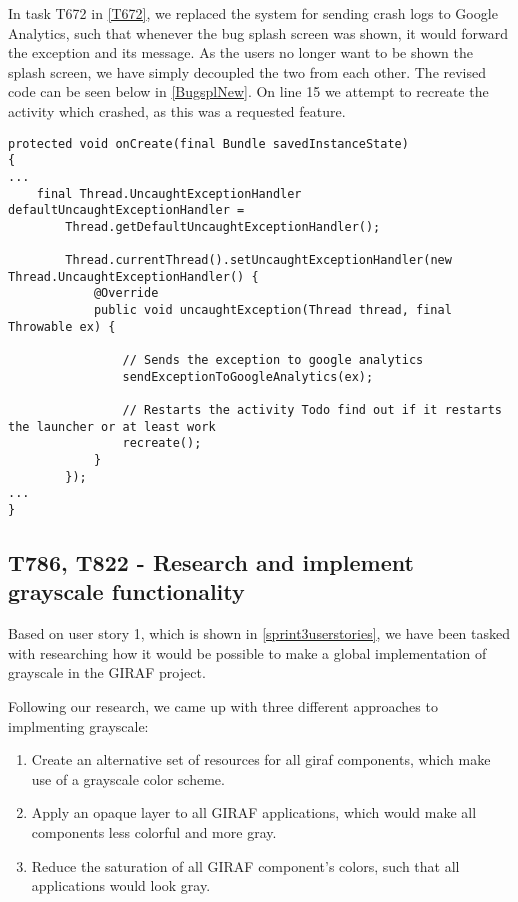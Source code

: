 In task T672 in \autoref{T672}, we replaced the system for sending crash logs to
Google Analytics, such that whenever the bug splash screen was shown, it would
forward the exception and its message. As the users no longer want to be shown
the splash screen, we have simply decoupled the two from each other. The revised
code can be seen below in \autoref{BugsplNew}. On line 15 we attempt to recreate
the activity which crashed, as this was a requested feature.\nl

\begin{minipage}[H]{\linewidth}
\begin{lstlisting}[caption = We use Google Analytics and try to recreate the activity, label = BugsplNew] 
protected void onCreate(final Bundle savedInstanceState) 
{ 
...
	final Thread.UncaughtExceptionHandler defaultUncaughtExceptionHandler =
    	Thread.getDefaultUncaughtExceptionHandler();

        Thread.currentThread().setUncaughtExceptionHandler(new Thread.UncaughtExceptionHandler() {
            @Override
            public void uncaughtException(Thread thread, final Throwable ex) {

                // Sends the exception to google analytics
                sendExceptionToGoogleAnalytics(ex);

                // Restarts the activity Todo find out if it restarts the launcher or at least work
                recreate();
            }
        });
...
}
\end{lstlisting}
\end{minipage}

\subsection{T786, T822 - Research and implement grayscale functionality}
Based on user story 1, which is shown in \autoref{sprint3userstories}, we have
been tasked with researching how it would be possible to make a global implementation of
grayscale in the GIRAF project.\nl

Following our research, we came up with three different approaches to
implmenting grayscale:

\begin{enumerate}
  \item Create an alternative set of resources for all giraf components, which
  make use of a grayscale color scheme.
  \item Apply an opaque layer to all GIRAF applications, which would make all
  components less colorful and more gray.
  \item Reduce the saturation of all GIRAF component's colors, such that all
  applications would look gray.
\end{enumerate}

